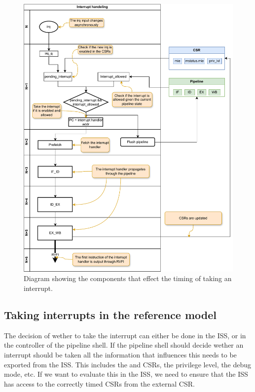 \begin{figure}
    \centering
    \includegraphics[width=1\linewidth]{figures/interrupt_handeling_timing.pdf}
    \caption{Diagram showing the components that effect the timing of taking an interrupt.}
    \label{fig:interrupt_timing}
\end{figure}


\subsection{Taking interrupts in the reference model}

The decision of wether to take the interrupt can either be done in the ISS, or in the controller of the pipeline shell. If the pipeline shell should decide wether an interrupt should be taken all the information that influences this needs to be exported from the ISS. This includes the  and  CSRs, the privilege level, the debug mode, etc. If we want to evaluate this in the ISS, we need to ensure that the ISS has access to the correctly timed CSRs from the external CSR. 


